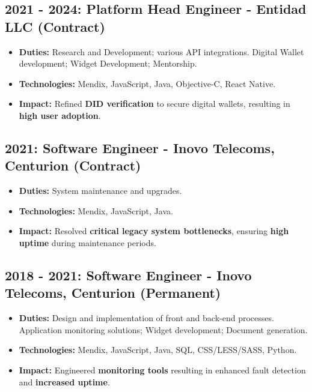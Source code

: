 \documentclass[a4paper,10pt]{article}
\begin{document}
\subsection{2021 - 2024: Platform Head Engineer - Entidad LLC (Contract)}
\begin{itemize}[leftmargin=*, noitemsep]
    \item \textbf{Duties:} Research and Development; various API integrations. Digital Wallet development; Widget Development; Mentorship.
    \item \textbf{Technologies:} Mendix, JavaScript, Java, Objective-C, React Native.
    \item \textbf{Impact:} Refined \textbf{DID verification} to secure digital wallets, resulting in \textbf{high user adoption}.
\end{itemize}

\subsection{2021: Software Engineer - Inovo Telecoms, Centurion (Contract)}
\begin{itemize}[leftmargin=*, noitemsep]
    \item \textbf{Duties:} System maintenance and upgrades.
    \item \textbf{Technologies:} Mendix, JavaScript, Java.
    \item \textbf{Impact:} Resolved \textbf{critical legacy system bottlenecks}, ensuring \textbf{high uptime} during maintenance periods.
\end{itemize}

\subsection{2018 - 2021: Software Engineer - Inovo Telecoms, Centurion (Permanent)}
\begin{itemize}[leftmargin=*, noitemsep]
    \item \textbf{Duties:} Design and implementation of front and back-end processes. Application monitoring solutions; Widget development; Document generation.
    \item \textbf{Technologies:} Mendix, JavaScript, Java, SQL, CSS/LESS/SASS, Python.
    \item \textbf{Impact:} Engineered \textbf{monitoring tools} resulting in enhanced fault detection and \textbf{increased uptime}.
\end{itemize}
\end{document}
